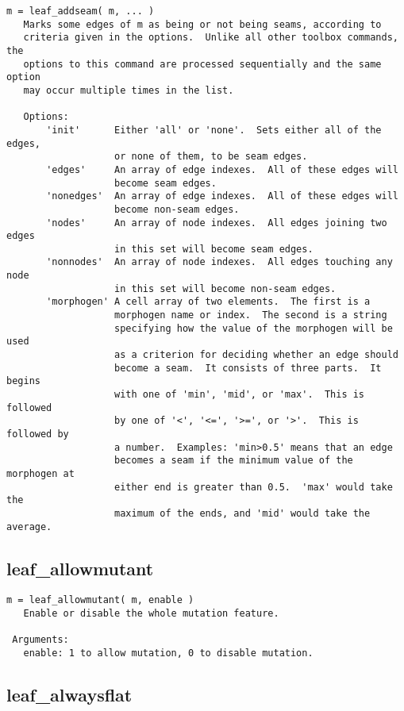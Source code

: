 \begin{verbatim}
m = leaf_addseam( m, ... )
   Marks some edges of m as being or not being seams, according to
   criteria given in the options.  Unlike all other toolbox commands, the
   options to this command are processed sequentially and the same option
   may occur multiple times in the list.

   Options:
       'init'      Either 'all' or 'none'.  Sets either all of the edges,
                   or none of them, to be seam edges.
       'edges'     An array of edge indexes.  All of these edges will
                   become seam edges.
       'nonedges'  An array of edge indexes.  All of these edges will
                   become non-seam edges.
       'nodes'     An array of node indexes.  All edges joining two edges
                   in this set will become seam edges.
       'nonnodes'  An array of node indexes.  All edges touching any node
                   in this set will become non-seam edges.
       'morphogen' A cell array of two elements.  The first is a
                   morphogen name or index.  The second is a string
                   specifying how the value of the morphogen will be used
                   as a criterion for deciding whether an edge should
                   become a seam.  It consists of three parts.  It begins
                   with one of 'min', 'mid', or 'max'.  This is followed
                   by one of '<', '<=', '>=', or '>'.  This is followed by
                   a number.  Examples: 'min>0.5' means that an edge
                   becomes a seam if the minimum value of the morphogen at
                   either end is greater than 0.5.  'max' would take the
                   maximum of the ends, and 'mid' would take the average.
\end{verbatim}

\subsection{leaf\_allowmutant}\label{section-leaf-allowmutant}

\begin{verbatim}
m = leaf_allowmutant( m, enable )
   Enable or disable the whole mutation feature.

 Arguments:
   enable: 1 to allow mutation, 0 to disable mutation.
\end{verbatim}

\subsection{leaf\_alwaysflat}\label{section-leaf-alwaysflat}

